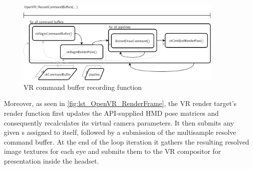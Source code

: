 \begin{figure}[htb]
  \centering
  \includegraphics[width=0.9\textwidth]{pictures/Tachyon_OpenVR_RecordCommandBuffers}
  \caption[VR render target's RecordCommandBuffers]{VR command buffer recording function}\label{fig:lst_OpenVR_RecordCommandBuffers}
\end{figure} 

Moreover, as seen in \autoref{fig:lst_OpenVR_RenderFrame}, the \gls{VR} render target's  render function first updates the API-supplied \gls{HMD} pose matrices and consequently recalculates its virtual camera parameters. It then submits any given s assigned to itself, followed by a submission of the multisample resolve command buffer. At the end of the loop iteration it gathers the resulting resolved image textures for each eye and submits them to the VR compositor for presentation inside the headset. 

